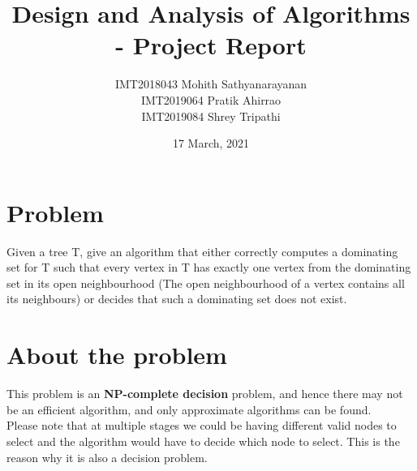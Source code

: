 \documentclass[letterpaper, 11pt]{article}
\title{Design and Analysis of Algorithms - Project Report}
\author{
IMT2018043 Mohith Sathyanarayanan \\
IMT2019064 Pratik Ahirrao \\
IMT2019084 Shrey Tripathi \\
}
\date{17 March, 2021}
\begin{document}
\maketitle

\section{Problem}
\label{sec:problem}

Given a tree T, give an algorithm that either correctly computes a dominating set for T such that every vertex in T has exactly one vertex from the dominating set in its open neighbourhood (The open neighbourhood of a vertex contains all its neighbours) or decides that such a dominating set does not exist.

\section{About the problem}
\label{sec:about}
This problem is an \textbf{NP-complete decision} problem, and hence there may not be an efficient algorithm, and only approximate algorithms can be found. \\
Please note that at multiple stages we could be having different valid nodes to select and the algorithm would have to decide which node to select. 
This is the reason why it is also a decision problem.
\end{document}
